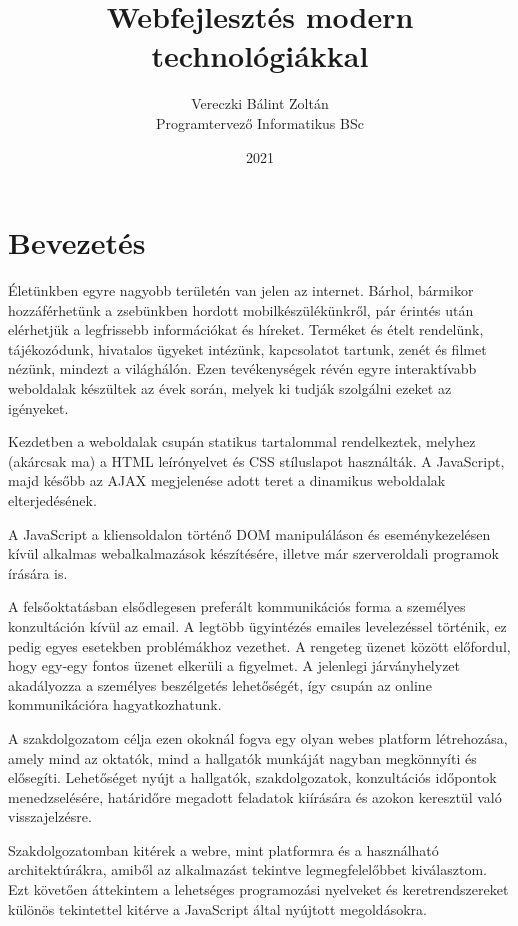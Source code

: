 \documentclass[
]{thesis-ekf}
\theoremstyle{definition}
\theoremstyle{remark}
\begin{document}
\title{Webfejlesztés modern technológiákkal}
\author{Vereczki Bálint Zoltán\\Programtervező Informatikus BSc}
\date{2021}
\maketitle
\tableofcontents

\chapter*{Bevezetés}
Életünkben egyre nagyobb területén van jelen az internet. Bárhol, bármikor hozzáférhetünk a zsebünkben hordott mobilkészülékünkről, pár érintés után elérhetjük a legfrissebb információkat és híreket. Terméket és ételt rendelünk, tájékozódunk, hivatalos ügyeket intézünk, kapcsolatot tartunk, zenét és filmet nézünk, mindezt a világhálón. Ezen tevékenységek révén egyre interaktívabb weboldalak készültek az évek során, melyek ki tudják szolgálni ezeket az igényeket.

Kezdetben a weboldalak csupán statikus tartalommal rendelkeztek, melyhez (akárcsak ma) a HTML leírónyelvet és CSS stíluslapot használták. A JavaScript, majd később az AJAX megjelenése adott teret a dinamikus weboldalak elterjedésének.

A JavaScript a kliensoldalon történő DOM manipuláláson és eseménykezelésen kívül alkalmas webalkalmazások készítésére, illetve már szerveroldali programok írására is.

A felsőoktatásban elsődlegesen preferált kommunikációs forma a személyes konzultáción kívül az email. A legtöbb ügyintézés emailes levelezéssel történik, ez pedig egyes esetekben problémákhoz vezethet. A rengeteg üzenet között előfordul, hogy egy-egy fontos üzenet elkerüli a figyelmet. A jelenlegi járványhelyzet akadályozza a személyes beszélgetés lehetőségét, így csupán az online kommunikációra hagyatkozhatunk.

A szakdolgozatom célja ezen okoknál fogva egy olyan webes platform létrehozása, amely mind az oktatók, mind a hallgatók munkáját nagyban megkönnyíti és elősegíti. Lehetőséget nyújt a hallgatók, szakdolgozatok, konzultációs időpontok menedzselésére, határidőre megadott feladatok kiírására és azokon keresztül való visszajelzésre.

Szakdolgozatomban kitérek a webre, mint platformra és a használható architektúrákra, amiből az alkalmazást tekintve legmegfelelőbbet kiválasztom. Ezt követően áttekintem a lehetséges programozási nyelveket és keretrendszereket különös tekintettel kitérve a JavaScript által nyújtott megoldásokra.
\end{document}

